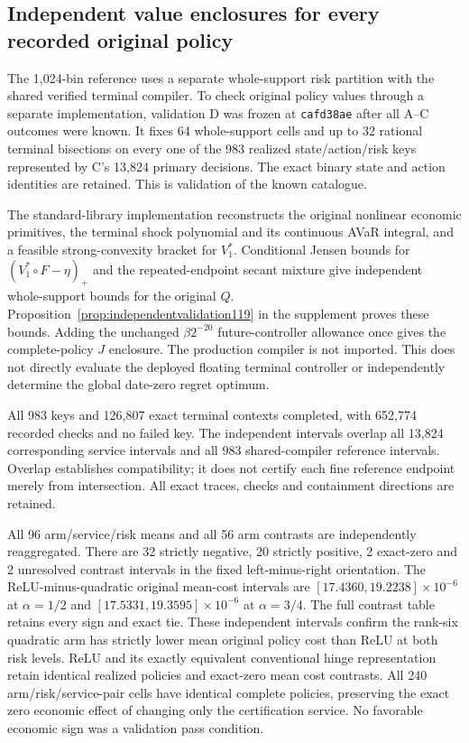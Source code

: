 \subsection{Independent value enclosures for every recorded original policy}
\label{sec:study119d}
The 1,024-bin reference uses a separate whole-support risk partition with the
shared verified terminal compiler. To check original policy values through a
separate implementation, validation D was frozen at \texttt{cafd38ae}
after all A--C outcomes were known. It fixes 64 whole-support cells and up to 32
rational terminal bisections on every one of the 983 realized state/action/risk
keys represented by C's 13,824 primary decisions. The exact binary state and
action identities are retained. This is validation of the known catalogue.

The standard-library implementation reconstructs the original nonlinear
economic primitives, the terminal shock polynomial and its continuous AVaR
integral, and a feasible strong-convexity bracket for $V_1^*$. Conditional
Jensen bounds for $(V_1^*\circ F-\eta)_+$ and the repeated-endpoint secant
mixture give independent whole-support bounds for the original $Q$.
Proposition~\ref{prop:independentvalidation119} in the supplement proves these bounds.
Adding the unchanged $\beta 2^{-20}$ future-controller allowance once gives
the complete-policy $J$ enclosure. The production compiler is not imported.
This does not directly evaluate the deployed floating terminal controller or
independently determine the global date-zero regret optimum.

All 983 keys and 126,807 exact terminal contexts completed, with
652,774 recorded checks and no failed key.
The independent intervals overlap all 13,824 corresponding service intervals
and all 983 shared-compiler reference intervals. Overlap establishes
compatibility; it does not certify each fine reference endpoint merely from
intersection. All exact traces, checks and containment directions are retained.



All 96 arm/service/risk means and all 56 arm contrasts are independently
reaggregated. There are 32 strictly negative, 20
strictly positive, 2 exact-zero and 2
unresolved contrast intervals in the fixed left-minus-right orientation.
The ReLU-minus-quadratic original mean-cost intervals are
$[17.4360, 19.2238]\times10^{-6}$
at $\alpha=1/2$ and
$[17.5331, 19.3595]\times10^{-6}$
at $\alpha=3/4$. The full contrast table retains every sign and exact tie.
These independent intervals confirm the rank-six quadratic arm has strictly lower mean original policy cost than ReLU at both risk levels. ReLU and its exactly equivalent conventional hinge representation retain identical realized policies and exact-zero mean cost contrasts.
All 240 arm/risk/service-pair cells have identical complete policies, preserving
the exact zero economic effect of changing only the certification service.
No favorable economic sign was a validation pass condition.

